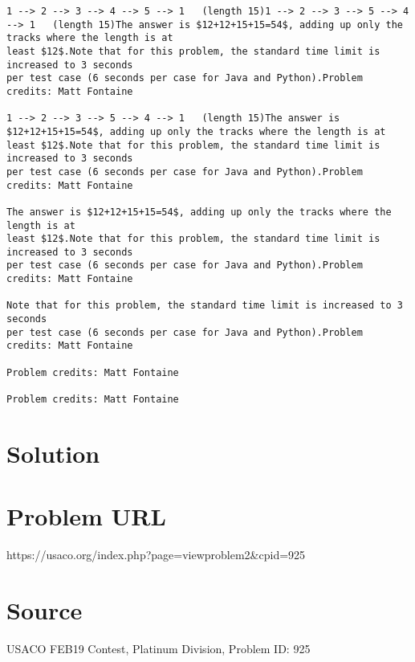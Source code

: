 \documentclass[12pt]{article}
\begin{document}
\begin{verbatim}
1 --> 2 --> 3 --> 4 --> 5 --> 1   (length 15)1 --> 2 --> 3 --> 5 --> 4 --> 1   (length 15)The answer is $12+12+15+15=54$, adding up only the tracks where the length is at
least $12$.Note that for this problem, the standard time limit is increased to 3 seconds
per test case (6 seconds per case for Java and Python).Problem credits: Matt Fontaine

1 --> 2 --> 3 --> 5 --> 4 --> 1   (length 15)The answer is $12+12+15+15=54$, adding up only the tracks where the length is at
least $12$.Note that for this problem, the standard time limit is increased to 3 seconds
per test case (6 seconds per case for Java and Python).Problem credits: Matt Fontaine

The answer is $12+12+15+15=54$, adding up only the tracks where the length is at
least $12$.Note that for this problem, the standard time limit is increased to 3 seconds
per test case (6 seconds per case for Java and Python).Problem credits: Matt Fontaine

Note that for this problem, the standard time limit is increased to 3 seconds
per test case (6 seconds per case for Java and Python).Problem credits: Matt Fontaine

Problem credits: Matt Fontaine

Problem credits: Matt Fontaine
\end{verbatim}

\section*{Solution}


\section*{Problem URL}
https://usaco.org/index.php?page=viewproblem2&cpid=925

\section*{Source}
USACO FEB19 Contest, Platinum Division, Problem ID: 925
\end{document}
